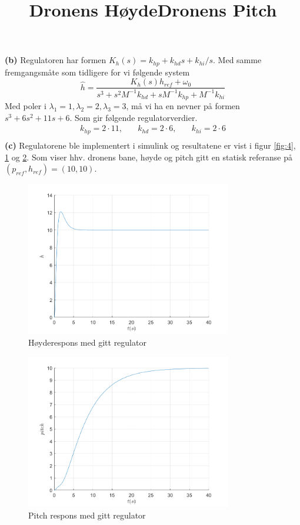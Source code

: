 \documentclass[11pt, a4paper, norsk]{rapport1} %
\begin{document}
\textbf{(b)} Regulatoren har formen $K_h(s) = k_{hp} + k_{hd}s + k_{hi}/s$. Med samme fremgangsmåte som tidligere for vi følgende system
\begin{equation}
    \hat{h} = \frac{K_h(s)h_{ref} + \omega_0}{s^3 + s^2M^{-1}k_{hd} + sM^{-1}k_{hp}+M^{-1}k_{hi}}
\end{equation}
Med poler i $\lambda_1 = 1, \lambda_2 = 2, \lambda_3 = 3$, må vi ha en nevner på formen $s^3 + 6s^2 + 11s + 6$.
Som gir følgende regulatorverdier.
\begin{equation}
    \begin{aligned}
        k_{hp} = 2\cdot11, &\quad k_{hd} = 2\cdot6, &\quad k_{hi} = 2\cdot6 \\
    \end{aligned}
\end{equation}
\textbf{(c)} Regulatorene ble implementert i simulink og resultatene er vist i figur \ref{fig:4}, \ref{fig:5} og \ref{fig:6}. Som viser hhv. dronens bane, høyde og pitch gitt en statisk referanse på
$(p_{ref},h_{ref}) = (10, 10)$.

\begin{figure}
    \centering
    \title{\textbf{Dronens Høyde}}
    \includegraphics[width=0.8\textwidth]{figures/oppg3_hoyde.png}
    \caption{Høyderespons med gitt regulator}
    \label{fig:5}
\end{figure}
\begin{figure}
    \centering
    \title{\textbf{Dronens Pitch}}
    \includegraphics[width=0.8\textwidth]{figures/oppg3_pitch.png}
    \caption{Pitch respons med gitt regulator}
    \label{fig:6}
\end{figure}
\end{document}
